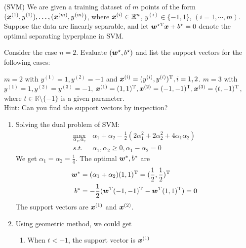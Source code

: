 \documentclass[a4paper,answers,12pt]{exam} %
\begin{document}
\begin{questions}
  \question(SVM)
  We are given a training dataset of $m$ points of the form $(\bm{x}^{(1)}, y^{(1)}), \dots, (\bm{x}^{(m)}, y^{(m)})$, where  $\bm{x}^{(i)} \in \mathbb{R}^n$, $y^{(i)} \in \{-1, 1\}$, $(i = 1, \cdots, m)$. Suppose the data are linearly separable, and let $\bm{w}^{\star\mathrm{T}}\bm{x} + b^\star = 0$ denote the optimal separating hyperplane in SVM.
  
\begin{parts}
  \begin{part}
  Consider the case $n = 2$. Evaluate $(\bm{w}^{\star}, b^{\star})$ and list the support vectors for the following cases:
  \begin{subparts}
    \subpart[10] $m = 2$ with $y^{(1)} = 1, y^{(2)} = -1$ and $\bm{x}^{(i)} = (y^{(i)}, y^{(i)})^{\mathrm{T}}, i = 1, 2$.
    \subpart[10] $m = 3$ with $y^{(1)} = 1, y^{(2)} = y^{(3)} = -1$, $\bm{x}^{(1)} = (1, 1)^{\mathrm{T}}, \bm{x}^{(2)} = (-1, -1)^{\mathrm{T}}, \bm{x}^{(3)} = (t, -1)^{\mathrm{T}}$, where $t \in \mathbb{R}\setminus\{-1\}$ is a given parameter.\\
    Hint: Can you find the support vectors by inspection? 
  \end{subparts}
  \end{part}
  \begin{solution}
  \begin{enumerate}[label=\roman*]
      \item Solving the dual problem of SVM:
      \begin{align*}
          \max_{\alpha_1, \alpha_2}
          \,& \alpha_1 + \alpha_2 - \frac{1}{2}
          (2\alpha_1^2+2\alpha_2^2 + 4 \alpha_1 \alpha_2) \\
          s.t. \,& \alpha_1, \alpha_2 \geq 0, \alpha_1 - \alpha_2 = 0
      \end{align*}
      We get $\alpha_1 = \alpha_2 = \frac{1}{4}$.
      The optimal $\bm{w}^*,b^*$ are
      \begin{align*}
          \bm{w}^* & = (\alpha_1 + \alpha_2)(1,1)^{\mathrm{T}} = (\frac{1}{2},\frac{1}{2})^{\mathrm{T}} \\
        b^* & = -\frac{1}{2}(\bm{w}^{\mathrm{T}}(-1,-1)^{\mathrm{T}} - \bm{w}^{\mathrm{T}}(1,1)^{\mathrm{T}}) = 0          
      \end{align*}
      The support vectors are $\bm{x}^{(1)}$ and
      $\bm{x}^{(2)}$.
      \item Using geometric method, we could get
      \begin{enumerate}[label=(\arabic*)]
          \item When $t < -1$, the support vector is $\bm{x}^{(1)}$

\end{enumerate}
\end{enumerate}
\end{solution}
\end{parts}
\end{questions}
\end{document}

